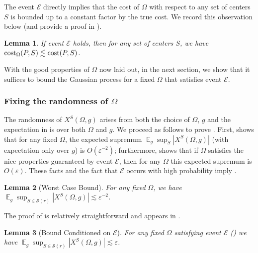 \documentclass[11pt]{article}
\newtheorem{lemma}{Lemma}[section]
\theoremstyle{restate}
\theoremstyle{definition}
\newcommand{\eps}{\ensuremath{\varepsilon}}
\newcommand{\E}{\mathop{\mathbb{E}}}
\newcommand{\cost}{\textnormal{cost}}
\newcommand{\costom}{\cost_\Omega} %
\newcommand{\inSR}{\in \mathcal{S}(r)}
\begin{document}
The event $\mathcal{E}$ directly implies that the cost of $\Omega$ with respect to any set of centers $S$ is bounded up to a constant factor by the true cost. We record this observation below (and provide a proof in ).

\begin{lemma}\label{lem: event-e-coreset-cost}
    If event $\mathcal{E}$ holds, then for any set of centers $S$, we have $\costom(P,S) \lesssim \cost(P,S)$.
\end{lemma}

With the good properties of $\Omega$ now laid out, in the next section, we show that it suffices to bound the Gaussian process for a fixed $\Omega$ that satisfies event $\mathcal{E}$.


\subsubsection{Fixing the randomness of \texorpdfstring{$\Omega$}{Omega}}\label{subsec:fixing-omega}









The randomness of $X^S(\Omega,g)$ arises from both the choice of $\Omega$, $g$ and the expectation in  is over both $\Omega$ and $g$. We proceed as follows to prove . First,  shows that for any fixed $\Omega$, the expected supremum $\E_g \sup_{S} \left\lvert X^S(\Omega,g)\right\rvert $ (with expectation only over $g$) is $O(\eps^{-2})$; furthermore,  shows that if $\Omega$ satisfies the nice properties guaranteed by event $\mathcal{E}$, then for any $\Omega$ this expected supremum is $O(\eps)$. These facts and the fact that $\mathcal{E}$ occurs with high probability imply .

\begin{lemma}[Worst Case Bound]\label{lem: worst-case-omega}
For any fixed $\Omega$, we have  $\E_{g} \sup_{S \inSR} \left\lvert X^S(\Omega, g) \right\rvert \lesssim \eps^{-2} $.
\end{lemma}
The proof of  is relatively straightforward and appears in .
\begin{lemma}[Bound Conditioned on $\mathcal{E}$]\label{lem: omega-event-e}
For any fixed $\Omega$ satisfying event $\mathcal{E}$ () we have $ \E_{g} \sup_{S \inSR} \left\lvert X^S(\Omega,g)\right\rvert \lesssim \eps $.
\end{lemma}
\end{document}

